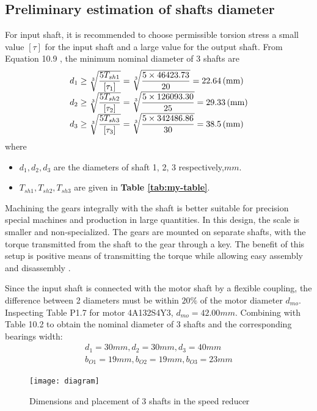 \subsection{Preliminary estimation of shafts diameter}
For input shaft, it is recommended to choose permissible torsion stress a small value $ [\tau] $ for the input shaft and a large value for the output shaft. From Equation 10.9 \cite{tk1}, the minimum nominal diameter of 3 shafts are
\[
\begin{array}{l}
d_1 \geq \sqrt[3]{\dfrac{5T_{sh1}}{[\tau_1]}} = \sqrt[3]{\dfrac{5\times 46423.73}{20}} = 22.64 \, (\mathrm{mm})\\
d_2 \geq \sqrt[3]{\dfrac{5T_{sh2}}{[\tau_2]}} = \sqrt[3]{\dfrac{5\times 126093.30}{25}} = 29.33 \, (\mathrm{mm})\\
d_3 \geq \sqrt[3]{\dfrac{5T_{sh3}}{[\tau_3]}} = \sqrt[3]{\dfrac{5\times 342486.86}{30}} = 38.5 \, (\mathrm{mm})
\end{array}
\]
where
\begin{itemize}
	\item $ d_1,d_2,d_3 $ are the diameters of shaft 1, 2, 3 respectively,$ \unit{mm} $.
	\item $ T_{sh1},T_{sh2},T_{sh3}$ are given in \textbf{Table \ref{tab:my-table}}.
\end{itemize}

Machining the gears integrally with the shaft is better suitable for precision special machines and production in large quantities. In this design, the scale is smaller and non-specialized. The gears are mounted on separate shafts, with the torque transmitted from the shaft to the gear through a key. The benefit of this setup is positive means of transmitting the torque while allowing easy assembly and disassembly \cite{mott_vavrek_wang_2018}.

Since the input shaft is connected with the motor shaft by a flexible coupling, the difference between 2 diameters must be within $ 20\% $ of the motor diameter $ d_{mo} $. Inspecting Table P1.7 for motor 4A132S4Y3, $ d_{mo}=42.00\unit{mm} $. Combining with Table 10.2 \cite{tk1} to obtain the nominal diameter of 3 shafts and the corresponding bearings width:
\[
\begin{array}{l}
d_1=30\unit{mm},d_2=30\unit{mm},d_3=40\unit{mm}\\
b_{O1}=19\unit{mm},b_{O2}=19\unit{mm},b_{O3}=23\unit{mm}
\end{array}
\]

\begin{figure}[ht]
	\centering
	\texttt{[image: diagram]}
	\caption{Dimensions and placement of 3 shafts in the speed reducer}
	\label{shaft}
\end{figure}

